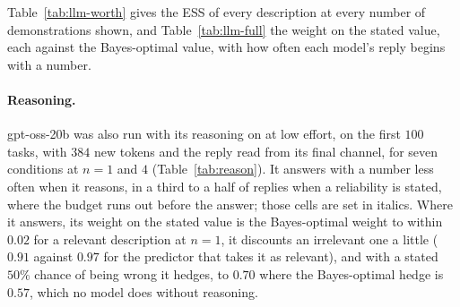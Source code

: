 \documentclass{article}
\begin{document}
Table~\ref{tab:llm-worth} gives the ESS of every description at every number of demonstrations shown, and Table~\ref{tab:llm-full} the weight on the stated value, each against the Bayes-optimal value, with how often each model's reply begins with a number.

\begin{table}[t]
\centering\scriptsize
\setlength{\tabcolsep}{1.2pt}
\caption{ESS of a description, model/Bayes-optimal, for every condition and number of demonstrations shown ($2{,}000$ tasks). ``Number'' is the share of replies that begin with a three-digit number, averaged over $n$; a cell is in italics where that share is below three quarters at that $n$. Rel./irrel.: a relevant or irrelevant description; w.: a stated chance of being wrong. Rel.\ and irrel.: a relevant or an irrelevant description; w.: a stated chance of being wrong. $> 64$: the model's error with the description is below its error with $64$ demonstrations and no description.}
\label{tab:llm-worth}
\vspace{3pt}

\end{table}

\paragraph{Reasoning.} gpt-oss-20b was also run with its reasoning on at low effort, on the first $100$ tasks, with $384$ new tokens and the reply read from its final channel, for seven conditions at $n = 1$ and $4$ (Table~\ref{tab:reason}). It answers with a number less often when it reasons, in a third to a half of replies when a reliability is stated, where the budget runs out before the answer; those cells are set in italics. Where it answers, its weight on the stated value is the Bayes-optimal weight to within $0.02$ for a relevant description at $n = 1$, it discounts an irrelevant one a little ($0.91$ against $0.97$ for the predictor that takes it as relevant), and with a stated $50\%$ chance of being wrong it hedges, to $0.70$ where the Bayes-optimal hedge is $0.57$, which no model does without reasoning.

\begin{table}[h]
\centering\small
\caption{\textbf{With reasoning, gpt-oss-20b puts the Bayes-optimal weight on the stated value.} Low reasoning effort, $100$ tasks, $\sigma = 60$. Number: the fraction of replies that are a number. Weight and error: the model's against the Bayes-optimal predictor's, which hedges with the stated $p$ where one is given. Italics: fewer than three quarters of the replies are a number.}
\label{tab:reason}

\end{table}
\end{document}
